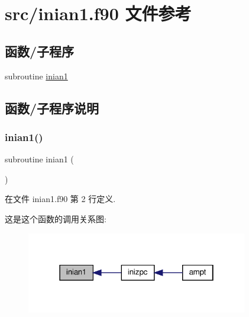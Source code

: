 \hypertarget{inian1_8f90}{}\section{src/inian1.f90 文件参考}
\label{inian1_8f90}
\subsection*{函数/子程序}
\begin{DoxyCompactItemize}
\item 
subroutine \mbox{\hyperlink{inian1_8f90_a4a94cd1cefd4e81da95d959173e5af31}{inian1}}
\end{DoxyCompactItemize}


\subsection{函数/子程序说明}
\mbox{\label{inian1_8f90_a4a94cd1cefd4e81da95d959173e5af31}} 
\subsubsection{\texorpdfstring{inian1()}{inian1()}}
{\footnotesize\ttfamily subroutine inian1 (\begin{DoxyParamCaption}{ }\end{DoxyParamCaption})}



在文件 inian1.\+f90 第 2 行定义.

这是这个函数的调用关系图\+:
\nopagebreak
\begin{figure}[H]
\begin{center}
\leavevmode
\includegraphics[width=274pt]{inian1_8f90_a4a94cd1cefd4e81da95d959173e5af31_icgraph}
\end{center}
\end{figure}

